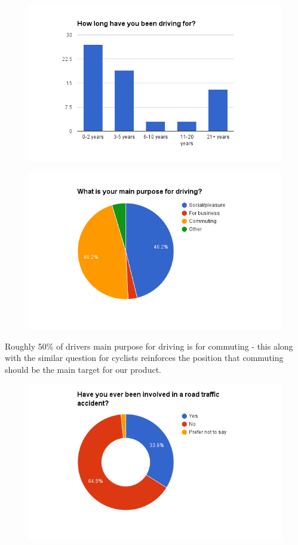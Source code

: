 \documentclass[a4paper]{report}
\begin{document}
{\begin{figure}[H]
\centering
\includegraphics[scale=0.6]{figures/research_report/questionnaires/cars_7}
\end{figure}
\begin{figure}[H]
\centering
\includegraphics[scale=0.6]{figures/research_report/questionnaires/cars_6}
\end{figure}
Roughly 50\% of drivers main purpose for driving is for commuting - this along with the similar question for cyclists reinforces the position that commuting should be the main target for our product.
\begin{figure}[H]
\centering
\includegraphics[scale=0.6]{figures/research_report/questionnaires/cars_8}

\end{figure}}
\end{document}
